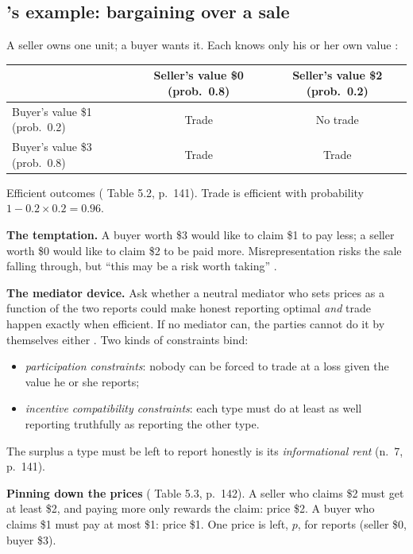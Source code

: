 \subsection{\MR's example: bargaining over a sale}

A seller owns one unit; a buyer wants it. Each knows only his or her own value :

\begin{center}
\begin{tabular}{lcc}
\toprule
 & Seller's value \$0 (prob.\ 0.8) & Seller's value \$2 (prob.\ 0.2) \\
\midrule
Buyer's value \$1 (prob.\ 0.2) & Trade & No trade \\
Buyer's value \$3 (prob.\ 0.8) & Trade & Trade \\
\bottomrule
\end{tabular}

\smallskip
{\footnotesize Efficient outcomes (\MR{} Table 5.2, p.~141). Trade is efficient with probability
$1 - 0.2 \times 0.2 = 0.96$.}
\end{center}

\textbf{The temptation.} A buyer worth \$3 would like to claim \$1 to pay less; a seller worth
\$0 would like to claim \$2 to be paid more. Misrepresentation risks the sale falling through,
but ``this may be a risk worth taking'' .

\textbf{The mediator device.} Ask whether a neutral mediator who sets prices as a function of the
two reports could make honest reporting optimal \emph{and} trade happen exactly when efficient.
If no mediator can, the parties cannot do it by themselves either . Two kinds of
constraints bind:
\begin{itemize}
  \item \emph{participation constraints}: nobody can be forced to trade at a loss given the
  value he or she reports;
  \item \emph{incentive compatibility constraints}: each type must do at least as well reporting
  truthfully as reporting the other type.
\end{itemize}
The surplus a type must be left to report honestly is its \emph{informational rent} (n.~7, p.~141).

\textbf{Pinning down the prices} (\MR{} Table 5.3, p.~142). A seller who claims \$2 must get at
least \$2, and paying more only rewards the claim: price \$2. A buyer who claims \$1 must pay at
most \$1: price \$1. One price is left, $p$, for reports (seller \$0, buyer \$3).

